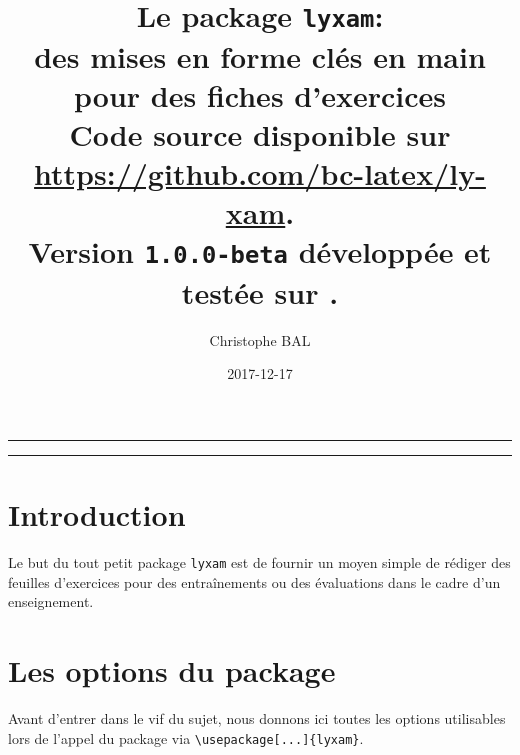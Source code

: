 \documentclass[12pt,a4paper]{scrartcl}
\theoremstyle{definition}
\begin{document}
\renewcommand\labelitemi{\raisebox{0.125em}{\tiny\textbullet}}
\renewcommand{\labelitemii}{---}

\title{%
	Le package \texttt{lyxam}:\\%
	des mises en forme clés en main\\%
	pour des fiches d'exercices\\%
	{\footnotesize Code source disponible sur \url{https://github.com/bc-latex/ly-xam}.}\\%
	{\footnotesize Version \texttt{1.0.0-beta} développée et testée sur \macosxname{}.}%
}
\author{Christophe BAL}
\date{2017-12-17}

\maketitle


\vspace{2em}

\hrule

\tableofcontents

\vspace{1.5em}

\hrule

\newpage



\section{Introduction}

Le but du tout petit package \verb+lyxam+ est de fournir un moyen simple de rédiger des feuilles d'exercices pour des entraînements ou des évaluations dans le cadre d'un enseignement.




\section{Les options du package}

Avant d'entrer dans le vif du sujet, nous donnons ici toutes les options utilisables lors de l'appel du package via \verb+\usepackage[...]{lyxam}+.
\end{document}
